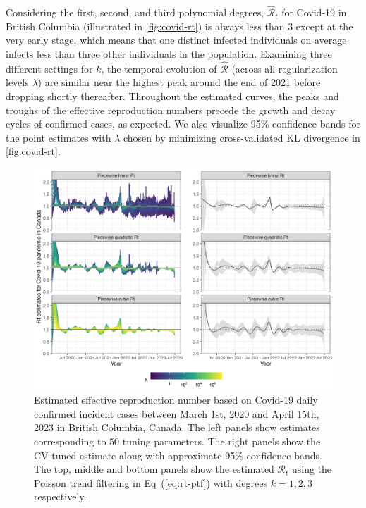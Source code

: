 \documentclass[10pt,letterpaper]{article}
\def\calR{\mathcal{R}}
\renewcommand{\eqref}[1]{Eq~(\ref{#1})}
\begin{document}
Considering the first, second, and third polynomial degrees, $\widehat{\calR}_t$
for Covid-19 in British Columbia (illustrated in \autoref{fig:covid-rt}) is
always less than $3$ except at the very early stage, which means that one
distinct infected individuals on average infects less than three other
individuals in the population. Examining three different settings for $k$, the
temporal evolution of $\widehat{\calR}$ (across all regularization levels
$\lambda$) are similar near the highest peak around the end of 2021 before
dropping shortly thereafter. Throughout the estimated curves, the peaks and
troughs of the effective reproduction numbers precede the growth and decay cycles of
confirmed cases, as expected. We also visualize 95\% confidence bands for the
point estimates with $\lambda$ chosen by minimizing cross-validated KL
divergence in \autoref{fig:covid-rt}.     

\begin{figure}[!ht]
  \centering
  \includegraphics[width=0.9\linewidth]{fig/covid_full_res.png}
  \caption{Estimated effective reproduction number based on Covid-19 daily
  confirmed incident cases between March 1st, 2020 and April 15th, 2023 in
  British Columbia, Canada. The left panels show estimates corresponding to 50
  tuning parameters. The right panels show the CV-tuned estimate along with
  approximate 95\% confidence bands. The top, middle and bottom panels show the
  estimated $\calR_t$ using the Poisson trend filtering in \eqref{eq:rt-ptf}
  with degrees $k=1,2,3$ respectively.} 
  \label{fig:covid-rt}
\end{figure} 
\end{document}
